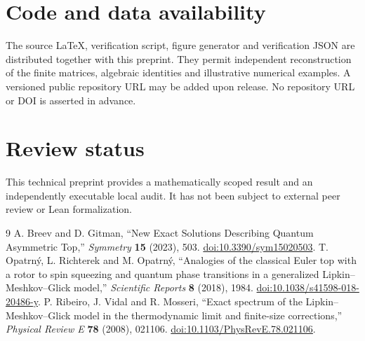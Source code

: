 \documentclass[11pt,a4paper]{article}
\begin{document}
\section*{Code and data availability}
The source \LaTeX{}, verification script, figure generator and
verification JSON are distributed together with this preprint.
They permit independent reconstruction of the finite matrices,
algebraic identities and illustrative numerical examples.
A versioned public repository URL may be added upon release.
No repository URL or DOI is asserted in advance.

\section*{Review status}
This technical preprint provides a mathematically scoped result and
an independently executable local audit. It has not been subject
to external peer review or Lean formalization.

\begin{thebibliography}{9}
A. Breev and D. Gitman, ``New Exact Solutions Describing Quantum
Asymmetric Top,'' \emph{Symmetry} \textbf{15} (2023), 503.
\href{https://doi.org/10.3390/sym15020503}{doi:10.3390/sym15020503}.
T. Opatrn\'{y}, L. Richterek and M. Opatrn\'{y},
``Analogies of the classical Euler top with a rotor to spin squeezing
and quantum phase transitions in a generalized Lipkin--Meshkov--Glick
model,'' \emph{Scientific Reports} \textbf{8} (2018), 1984.
\href{https://doi.org/10.1038/s41598-018-20486-y}
{doi:10.1038/s41598-018-20486-y}.
P. Ribeiro, J. Vidal and R. Mosseri,
``Exact spectrum of the Lipkin--Meshkov--Glick model in the
thermodynamic limit and finite-size corrections,''
\emph{Physical Review E} \textbf{78} (2008), 021106.
\href{https://doi.org/10.1103/PhysRevE.78.021106}
{doi:10.1103/PhysRevE.78.021106}.
\end{thebibliography}
\end{document}
